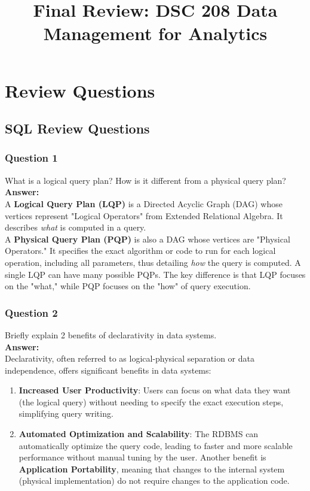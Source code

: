 \documentclass{article}
\title{Final Review: DSC 208 Data Management for Analytics}
\author{}
\date{}
\begin{document}
\maketitle


\section*{Review Questions}

\subsection*{SQL Review Questions}

\subsubsection*{Question 1}
What is a logical query plan? How is it different from a physical query plan?\\

\textbf{Answer:}\\

A \textbf{Logical Query Plan (LQP)} is a Directed Acyclic Graph (DAG) whose vertices represent "Logical Operators" from Extended Relational Algebra. It describes \textit{what} is computed in a query.\\

A \textbf{Physical Query Plan (PQP)} is also a DAG whose vertices are "Physical Operators." It specifies the exact algorithm or code to run for each logical operation, including all parameters, thus detailing \textit{how} the query is computed. A single LQP can have many possible PQPs. The key difference is that LQP focuses on the "what," while PQP focuses on the "how" of query execution.\\

\subsubsection*{Question 2}
Briefly explain 2 benefits of declarativity in data systems.\\

\textbf{Answer:}\\

Declarativity, often referred to as logical-physical separation or data independence, offers significant benefits in data systems:\\

\begin{enumerate}
    \item \textbf{Increased User Productivity}: Users can focus on what data they want (the logical query) without needing to specify the exact execution steps, simplifying query writing.
    \item \textbf{Automated Optimization and Scalability}: The RDBMS can automatically optimize the query code, leading to faster and more scalable performance without manual tuning by the user. Another benefit is \textbf{Application Portability}, meaning that changes to the internal system (physical implementation) do not require changes to the application code.
\end{enumerate}
\end{document}
